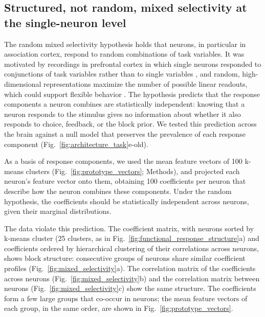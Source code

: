 \documentclass[10pt,lineno]{elife}
\begin{document}
\iffalse %
\subsection{Structured, not random, mixed selectivity at the single-neuron level}

The random mixed selectivity hypothesis holds that neurons, in particular in association cortex, respond to random combinations of task variables. It was motivated by recordings in prefrontal cortex in which single neurons responded to conjunctions of task variables rather than to single variables \cite{rigotti2013importance}, and random, high-dimensional representations maximize the number of possible linear readouts, which could support flexible behavior \cite{fusi2016neurons, bernardi2020geometry}. The hypothesis predicts that the response components a neuron combines are statistically independent: knowing that a neuron responds to the stimulus gives no information about whether it also responds to choice, feedback, or the block prior. We tested this prediction across the brain against a null model that preserves the prevalence of each response component (Fig.~\ref{fig:architecture_task}e-old).

As a basis of response components, we used the mean feature vectors of 100 k-means clusters (Fig.~\ref{fig:prototype_vectors}; Methods), and projected each neuron's feature vector onto them, obtaining 100 coefficients per neuron that describe how the neuron combines these components. Under the random hypothesis, the coefficients should be statistically independent across neurons, given their marginal distributions.

The data violate this prediction. The coefficient matrix, with neurons sorted by k-means cluster (25 clusters, as in Fig.~\ref{fig:functional_response_structure}a) and coefficients ordered by hierarchical clustering of their correlations across neurons, shows block structure: consecutive groups of neurons share similar coefficient profiles (Fig.~\ref{fig:mixed_selectivity}a). The correlation matrix of the coefficients across neurons (Fig.~\ref{fig:mixed_selectivity}b) and the correlation matrix between neurons (Fig.~\ref{fig:mixed_selectivity}c) show the same structure. The coefficients form a few large groups that co-occur in neurons; the mean feature vectors of each group, in the same order, are shown in Fig.~\ref{fig:prototype_vectors}.
\end{document}
